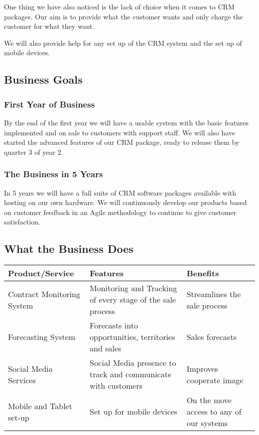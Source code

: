 \documentclass[DIV=calc, paper=a4, fontsize=11pt]{scrartcl}	 %
\begin{document}
One thing we have also noticed is the lack of choice when it comes to CRM packages. Our aim is to
provide what the customer wants and only charge the customer for what they want.

We will also provide help for any set up of the CRM system and the set up of mobile devices.

\subsection{Business Goals}
\subsubsection*{First Year of Business}
By the end of the first year we will have a usable system with the basic features implemented and
on sale to customers with support staff. We will also have started the advanced features of our
CRM package, ready to release them by quarter 3 of year 2. 

\subsubsection*{The Business in 5 Years}
In 5 years we will have a full suite of CRM software packages available with hosting on our own
hardware. We will continuously develop our products based on customer feedback in an Agile 
methodology to continue to give customer satisfaction.

\subsection{What the Business Does}
\begin{tabular}{|l|p{}|p{}|}\hline
Product/Service & Features & Benefits \\ \hline
Contract Monitoring System & Monitoring and Tracking of every stage of the sale process & Streamlines the sale process \\ \hline
Forecasting System & Forecasts into opportunities, territories and sales & Sales forecasts \\ \hline
Social Media Services & Social Media presence to track and communicate with customers & Improves cooperate image \\ \hline
Mobile and Tablet set-up & Set up for mobile devices & On the move access to any of our systems \\ \hline
\end{tabular}
\end{document}
